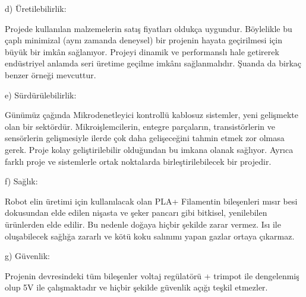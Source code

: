 d) Üretilebilirlik: 

	Projede kullanılan malzemelerin satış fiyatları oldukça uygundur. Böylelikle bu çaplı minimizal (aynı zamanda deneysel) bir projenin hayata geçirilmesi için büyük bir imkân sağlanıyor. Projeyi dinamik ve performanslı hale getirerek endüstriyel anlamda seri üretime geçilme imkânı sağlanmalıdır. Şuanda da birkaç benzer örneği mevcuttur.
    
e) Sürdürülebilirlik:

	Günümüz çağında Mikrodenetleyici kontrollü kablosuz sistemler, yeni gelişmekte olan bir sektördür. Mikroişlemcilerin, entegre parçaların, transistörlerin ve sensörlerin gelişmesiyle ilerde çok daha gelişeceğini tahmin etmek zor olmasa gerek. Proje kolay geliştirilebilir olduğundan bu imkana olanak sağlıyor. Ayrıca farklı proje ve sistemlerle ortak noktalarda birleştirilebilecek bir projedir. 
    
f) Sağlık: 

	Robot elin üretimi için kullanılacak olan PLA+ Filamentin bileşenleri mısır besi dokusundan elde edilen nişasta ve şeker pancarı gibi bitkisel, yenilebilen ürünlerden elde edilir. Bu nedenle doğaya hiçbir şekilde zarar vermez. Isı ile oluşabilecek sağlığa zararlı ve kötü koku salınımı yapan gazlar ortaya çıkarmaz.
    
 g) Güvenlik: 
 
	Projenin devresindeki tüm bileşenler voltaj regülatörü + trimpot ile dengelenmiş olup 5V ile çalışmaktadır ve hiçbir şekilde güvenlik açığı teşkil etmezler.

\clearpage